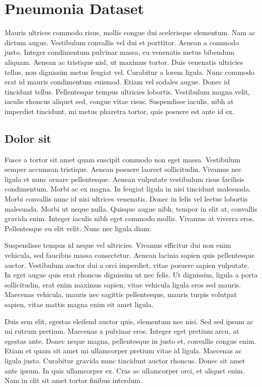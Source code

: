 \section{Pneumonia Dataset}
\label{sec:ipsum}
Mauris ultrices commodo risus, mollis congue dui scelerisque elementum. Nam ac dictum augue. Vestibulum convallis vel dui et porttitor. Aenean a commodo justo. Integer condimentum pulvinar massa, eu venenatis metus bibendum aliquam. Aenean ac tristique nisl, ut maximus tortor. Duis venenatis ultricies tellus, non dignissim metus feugiat vel. Curabitur a lorem ligula. Nunc commodo erat id mauris condimentum euismod. Etiam vel sodales augue. Donec id tincidunt tellus. Pellentesque tempus ultricies lobortis. Vestibulum magna velit, iaculis rhoncus aliquet sed, congue vitae risus. Suspendisse iaculis, nibh at imperdiet tincidunt, mi metus pharetra tortor, quis posuere est ante id ex.

\subsection{Dolor sit} %
\label{sub:dolor_sit}
Fusce a tortor sit amet quam suscipit commodo non eget massa. Vestibulum semper accumsan tristique. Aenean posuere laoreet sollicitudin. Vivamus nec ligula et nunc ornare pellentesque. Aenean vulputate vestibulum risus facilisis condimentum. Morbi ac ex magna. In feugiat ligula in nisi tincidunt malesuada. Morbi convallis nunc id nisi ultrices venenatis. Donec in felis vel lectus lobortis malesuada. Morbi ut neque nulla. Quisque augue nibh, tempor in elit at, convallis gravida enim. Integer iaculis nibh eget commodo mollis. Vivamus at viverra eros. Pellentesque eu elit velit. Nunc nec ligula diam.

Suspendisse tempus id neque vel ultricies. Vivamus efficitur dui non enim vehicula, sed faucibus massa consectetur. Aenean lacinia sapien quis pellentesque auctor. Vestibulum auctor dui a orci imperdiet, vitae posuere sapien vulputate. In eget augue quis erat rhoncus dignissim ut nec felis. Ut dignissim, ligula a porta sollicitudin, erat enim maximus sapien, vitae vehicula ligula eros sed mauris. Maecenas vehicula, mauris nec sagittis pellentesque, mauris turpis volutpat sapien, vitae mattis magna enim sit amet ligula.

Duis sem elit, egestas eleifend auctor quis, elementum nec nisi. Sed sed ipsum ac mi rutrum pretium. Maecenas a pulvinar eros. Integer eget pretium arcu, at egestas ante. Donec neque magna, pellentesque in justo et, convallis congue enim. Etiam et quam sit amet mi ullamcorper pretium vitae id ligula. Maecenas ac ligula justo. Curabitur gravida nunc tincidunt auctor rhoncus. Donec sit amet ante ipsum. In quis ullamcorper ex. Cras ac ullamcorper orci, et aliquet enim. Nam in elit sit amet tortor finibus interdum.

